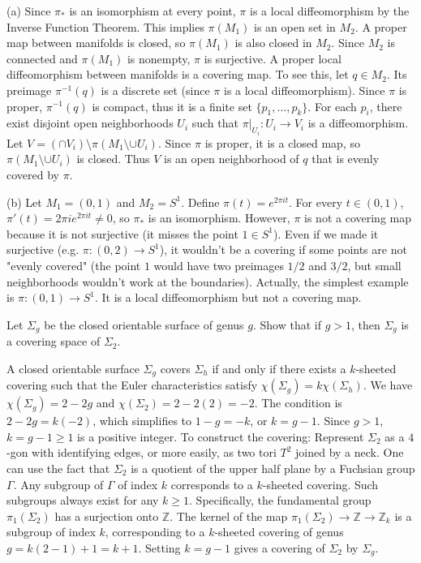 \begin{solution}
(a) Since $\pi_*$ is an isomorphism at every point, $\pi$ is a local diffeomorphism by the Inverse Function Theorem. This implies $\pi(M_1)$ is an open set in $M_2$. A proper map between manifolds is closed, so $\pi(M_1)$ is also closed in $M_2$. Since $M_2$ is connected and $\pi(M_1)$ is nonempty, $\pi$ is surjective.
A proper local diffeomorphism between manifolds is a covering map. To see this, let $q \in M_2$. Its preimage $\pi^{-1}(q)$ is a discrete set (since $\pi$ is a local diffeomorphism). Since $\pi$ is proper, $\pi^{-1}(q)$ is compact, thus it is a finite set $\{p_1, \dots, p_k\}$.
For each $p_i$, there exist disjoint open neighborhoods $U_i$ such that $\pi|_{U_i}: U_i \to V_i$ is a diffeomorphism. Let $V = (\cap V_i) \setminus \pi(M_1 \setminus \cup U_i)$. Since $\pi$ is proper, it is a closed map, so $\pi(M_1 \setminus \cup U_i)$ is closed. Thus $V$ is an open neighborhood of $q$ that is evenly covered by $\pi$.

(b) Let $M_1 = (0, 1)$ and $M_2 = S^1$. Define $\pi(t) = e^{2\pi i t}$.
For every $t \in (0, 1)$, $\pi'(t) = 2\pi i e^{2\pi i t} \neq 0$, so $\pi_*$ is an isomorphism.
However, $\pi$ is not a covering map because it is not surjective (it misses the point $1 \in S^1$). Even if we made it surjective (e.g. $\pi: (0, 2) \to S^1$), it wouldn't be a covering if some points are not "evenly covered" (the point $1$ would have two preimages $1/2$ and $3/2$, but small neighborhoods wouldn't work at the boundaries).
Actually, the simplest example is $\pi: (0, 1) \to S^1$. It is a local diffeomorphism but not a covering map.
\end{solution}

\begin{exercise}
\label{geometry:2010:5}
Let $\Sigma_{g}$ be the closed orientable surface of genus $g$. Show that if $g > 1$, then $\Sigma_{g}$ is a covering space of $\Sigma_{2}$.
\end{exercise}

\begin{solution}
A closed orientable surface $\Sigma_g$ covers $\Sigma_h$ if and only if there exists a $k$-sheeted covering such that the Euler characteristics satisfy $\chi(\Sigma_g) = k \chi(\Sigma_h)$.
We have $\chi(\Sigma_g) = 2 - 2g$ and $\chi(\Sigma_2) = 2 - 2(2) = -2$.
The condition is $2 - 2g = k(-2)$, which simplifies to $1 - g = -k$, or $k = g - 1$.
Since $g > 1$, $k = g - 1 \geq 1$ is a positive integer.
To construct the covering: Represent $\Sigma_2$ as a $4$-gon with identifying edges, or more easily, as two tori $T^2$ joined by a neck.
One can use the fact that $\Sigma_2$ is a quotient of the upper half plane by a Fuchsian group $\Gamma$. Any subgroup of $\Gamma$ of index $k$ corresponds to a $k$-sheeted covering. Such subgroups always exist for any $k \geq 1$.
Specifically, the fundamental group $\pi_1(\Sigma_2)$ has a surjection onto $\mathbb{Z}$. The kernel of the map $\pi_1(\Sigma_2) \to \mathbb{Z} \to \mathbb{Z}_k$ is a subgroup of index $k$, corresponding to a $k$-sheeted covering of genus $g = k(2-1) + 1 = k+1$.
Setting $k = g-1$ gives a covering of $\Sigma_2$ by $\Sigma_g$.
\end{solution}

